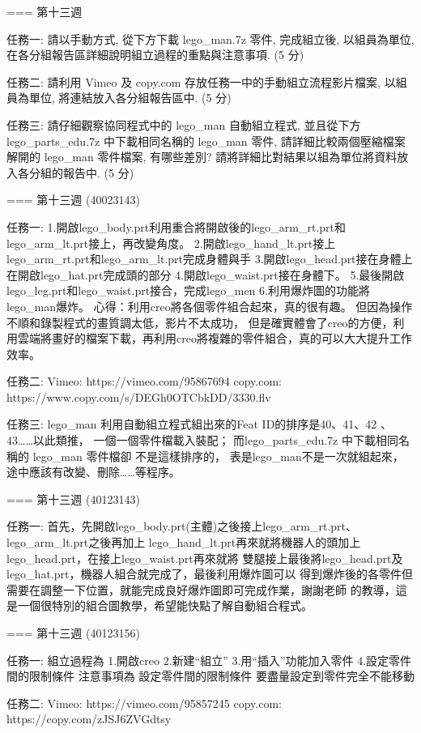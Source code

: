 \documentclass[]{article}
\begin{document}
=== 第十三週

任務一: 請以手動方式, 從下方下載 lego\_man.7z 零件, 完成組立後,
以組員為單位, 在各分組報告區詳細說明組立過程的重點與注意事項. (5 分)

任務二: 請利用 Vimeo 及 copy.com 存放任務一中的手動組立流程影片檔案,
以組員為單位, 將連結放入各分組報告區中. (5 分)

任務三: 請仔細觀察協同程式中的 lego\_man 自動組立程式, 並且從下方
lego\_parts\_edu.7z 中下載相同名稱的 lego\_man 零件,
請詳細比較兩個壓縮檔案解開的 lego\_man 零件檔案, 有哪些差別?
請將詳細比對結果以組為單位將資料放入各分組的報告中. (5 分)

=== 第十三週 (40023143)

任務一:
1.開啟lego\_body.prt利用重合將開啟後的lego\_arm\_rt.prt和lego\_arm\_lt.prt接上，再改變角度。
2.開啟lego\_hand\_lt.prt接上lego\_arm\_rt.prt和lego\_arm\_lt.prt完成身體與手
3.開啟lego\_head.prt接在身體上在開啟lego\_hat.prt完成頭的部分
4.開啟lego\_waist.prt接在身體下。
5.最後開啟lego\_leg.prt和lego\_waist.prt接合，完成lego\_men
6.利用爆炸圖的功能將lego\_man爆炸。
心得：利用creo將各個零件組合起來，真的很有趣。
但因為操作不順和錄製程式的畫質調太低，影片不太成功，
但是確實體會了creo的方便，利用雲端將畫好的檔案下載，再利用creo將複雜的零件組合，真的可以大大提升工作效率。

任務二: Vimeo: https://vimeo.com/95867694 copy.com:
https://www.copy.com/s/DEGh0OTCbkDD/3330.flv

任務三: lego\_man 利用自動組立程式組出來的Feat ID的排序是40、41、42
、43\ldots{}\ldots{}以此類推， 一個一個零件檔載入裝配；
而lego\_parts\_edu.7z 中下載相同名稱的 lego\_man 零件檔卻
不是這樣排序的，
表是lego\_man不是一次就組起來，途中應該有改變、刪除\ldots{}\ldots{}等程序。

=== 第十三週 (40123143)

任務一:
首先，先開啟lego\_body.prt(主體)之後接上lego\_arm\_rt.prt、lego\_arm\_lt.prt之後再加上
lego\_hand\_lt.prt再來就將機器人的頭加上lego\_head.prt，在接上lego\_waist.prt再來就將
雙腿接上最後將lego\_head.prt及lego\_hat.prt，機器人組合就完成了，最後利用爆炸圖可以
得到爆炸後的各零件但需要在調整一下位置，就能完成良好爆炸圖即可完成作業，謝謝老師
的教導，這是一個很特別的組合圖教學，希望能快點了解自動組合程式。

=== 第十三週 (40123156)

任務一: 組立過程為 1.開啟creo 2.新建``組立'' 3.用``插入''功能加入零件
4.設定零件間的限制條件 注意事項為 設定零件間的限制條件
要盡量設定到零件完全不能移動

任務二: Vimeo: https://vimeo.com/95857245 copy.com:
https://copy.com/zJSJ6ZVGdtsy
\end{document}
